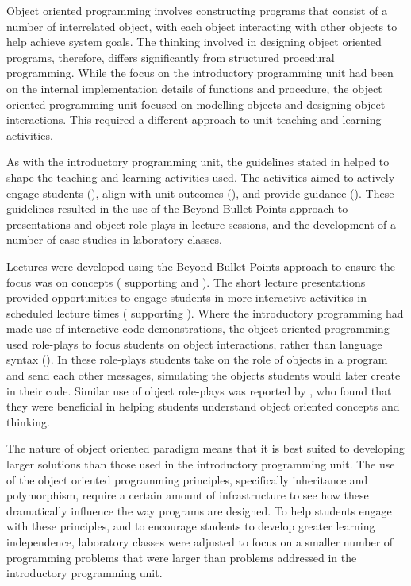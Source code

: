 Object oriented programming involves constructing programs that consist of a number of interrelated object, with each object interacting with other objects to help achieve system goals. The thinking involved in designing object oriented programs, therefore, differs significantly from structured procedural programming. While the focus on the introductory programming unit had been on the internal implementation details of functions and procedure, the object oriented programming unit focused on modelling objects and designing object interactions. This required a different approach to unit teaching and learning activities.

As with the introductory programming unit, the guidelines stated in  helped to shape the teaching and learning activities used. The activities aimed to actively engage students (), align with unit outcomes (), and provide guidance (). These guidelines resulted in the use of the Beyond Bullet Points approach to presentations and object role-plays in lecture sessions, and the development of a number of case studies in laboratory classes.

Lectures were developed using the Beyond Bullet Points approach to ensure the focus was on concepts ( supporting  and ). The short lecture presentations provided opportunities to engage students in more interactive activities in scheduled lecture times ( supporting ). Where the introductory programming had made use of interactive code demonstrations, the object oriented programming used role-plays to focus students on object interactions, rather than language syntax (). In these role-plays students take on the role of objects in a program and send each other messages, simulating the objects students would later create in their code. Similar use of object role-plays was reported by \citet{Borstler:2005}, who found that they were beneficial in helping students understand object oriented concepts and thinking. 

The nature of object oriented paradigm means that it is best suited to developing larger solutions than those used in the introductory programming unit. The use of the object oriented programming principles, specifically inheritance and polymorphism, require a certain amount of infrastructure to see how these dramatically influence the way programs are designed. To help students engage with these principles, and to encourage students to develop greater learning independence, laboratory classes were adjusted to focus on a smaller number of programming problems that were larger than problems addressed in the introductory programming unit. 

